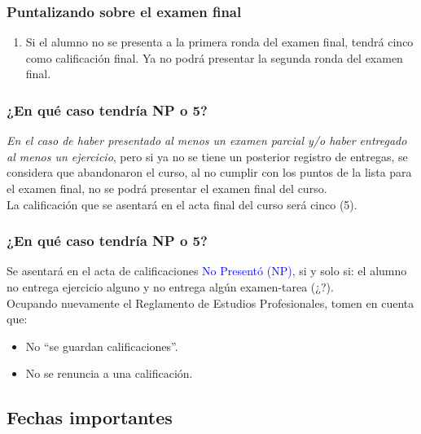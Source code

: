 \documentclass[12pt]{beamer}
\begin{document}
\begin{frame}
\frametitle{Puntalizando sobre el examen final}
\begin{enumerate}[<+->]
\conti    
\item Si el alumno no se presenta a la primera ronda del examen final, tendrá cinco como calificación final. Ya no podrá presentar la segunda ronda del examen final.
\end{enumerate}
\end{frame}
\begin{frame}
\frametitle{\textbf{¿En qué caso tendría NP o 5?}}
\emph{En el caso de haber presentado al menos un examen parcial y/o haber entregado al menos un ejercicio}, \pause pero si ya no se tiene un posterior registro de entregas, se considera que abandonaron el curso, al no cumplir con los puntos de la lista para el examen final, no se podrá presentar el examen final del curso.
\\
\bigskip
\pause
La calificación que se asentará en el acta final del curso será \textcolor{lava}{cinco (5)}.
\end{frame}
\begin{frame}
\frametitle{\textbf{¿En qué caso tendría NP o 5?}}
Se asentará en el acta de calificaciones \textcolor{blue}{No Presentó (NP)}, si y solo si: el alumno no entrega ejercicio alguno y no entrega algún examen-tarea (¿?).
\\
\bigskip
\pause
Ocupando nuevamente el Reglamento de Estudios Profesionales, tomen en cuenta que:
\pause
\begin{itemize}[<+->]
\item[\ding{212}] No \enquote{se guardan calificaciones}.
\item[\ding{212}] No se renuncia a una calificación.
\end{itemize}
\end{frame}

\subsection{Fechas importantes}
\end{document}
